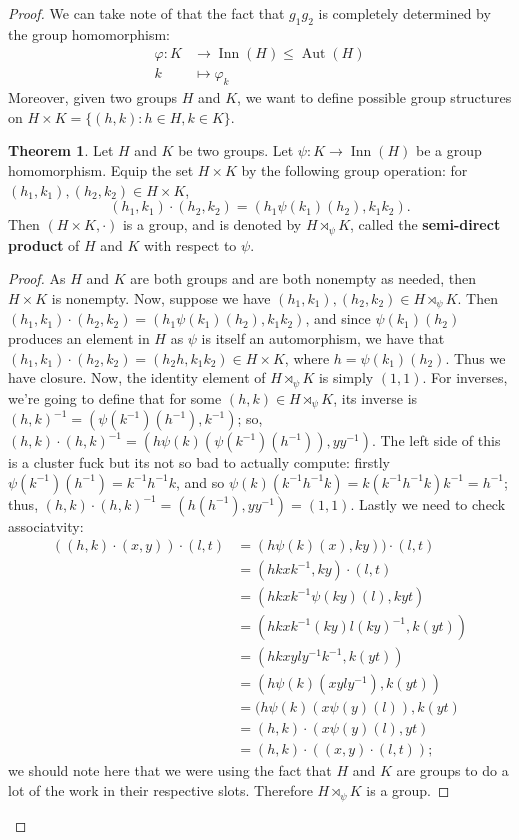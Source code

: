 \documentclass[9pt,reqno]{amsart}
\theoremstyle{definition}
\newtheorem{theorem}{Theorem}[section]
\DeclareMathOperator{\aut}{Aut}
\DeclareMathOperator{\inn}{Inn}
\newcommand{\lra}{\longrightarrow}
\newcommand{\lmt}{\longmapsto}
\begin{document}
\begin{proof}
We can take note of that the fact that $g_1 g_2$ is completely determined by the group homomorphism: 
\begin{align*} \varphi \colon K &\lra \inn (H) \leq \aut (H) \\  
k &\lmt \varphi_k 
\end{align*}
Moreover, given two groups $H$ and $K$, we want to define possible group structures on $H \times K = \{ (h, k) \colon h \in H, k \in K \}$. 
\begin{theorem} Let $H$ and $K$ be two groups. Let $\psi \colon K \lra \inn (H)$ be a group homomorphism. Equip the set $H \times K$ by the following group operation: for $(h_1, k_1), (h_2, k_2)  \in H \times K$, 
\[ (h_1, k_1) \cdot (h_2, k_2) = (h_1 \psi (k_1) (h_2), k_1 k_2 ) .\]
Then $(H \times K, \cdot)$ is a group, and is denoted by $H \rtimes_\psi K$, called the \textbf{semi-direct product} of $H$ and $K$ with respect to $\psi$. 
\begin{proof} As $H$ and $K$ are both groups and are both nonempty as needed, then $H \times K$ is nonempty. Now, suppose we have $(h_1, k_1), (h_2, k_2) \in H \rtimes_\psi K$. Then $(h_1, k_1) \cdot (h_2, k_2) = (h_1 \psi (k_1) (h_2), k_1 k_2 )$, and since $\psi (k_1) (h_2)$ produces an element in $H$ as $\psi$ is itself an automorphism, we have that $(h_1, k_1) \cdot (h_2, k_2) = (h_2 h, k_1 k_2 ) \in H \times K$, where $h = \psi (k_1) (h_2)$. Thus we have closure. Now, the identity element of $H \rtimes_\psi K$ is simply $(1, 1)$. For inverses, we're going to define that for some $(h, k) \in H \rtimes_\psi K$, its inverse is $(h, k)^{-1} = (\psi(k^{-1} )(h^{-1}) , k^{-1})$; so, $(h, k) \cdot (h, k)^{-1} = (h \psi (k)( \psi (k^{-1} ) (h^{-1} )) , yy^{-1} )$. The left side of this is a cluster fuck but its not so bad to actually compute: firstly $\psi (k^{-1} )(h^{-1}) = k^{-1} h^{-1} k$, and so $\psi (k) ( k^{-1} h^{-1} k) = k (k^{-1} h^{-1} k) k^{-1} =  h^{-1}$; thus, $(h, k) \cdot (h, k)^{-1} = (h(h^{-1}) , yy^{-1}) = (1, 1)$. Lastly we need to check associatvity:
\begin{align*}
 ( (h, k) \cdot (x, y) ) \cdot (l, t) &= (h \psi (k) (x), ky) ) \cdot (l, t)  \\
 &= (h kxk^{-1}, ky) \cdot (l, t) \\
 &= ( h kxk^{-1} \psi (ky) (l), kyt ) \\
 &= ( hkxk^{-1} (ky) l (ky)^{-1}, k(yt)) \\
 &= (hkx yly^{-1} k^{-1}, k(yt))  \\
 &= (h \psi(k) (xyly^{-1}) , k(yt)) \\
 &= (h \psi (k) (x\psi(y)(l)), k(yt) \\
  &= (h, k) \cdot (x \psi(y)(l), yt) \\ 
 &= (h, k) \cdot ( (x, y) \cdot (l, t)) ; 
\end{align*} 
we should note here that we were using the fact that $H$ and $K$ are groups to do a lot of the work in their respective slots. Therefore $H \rtimes_\psi K$ is a group. 
\end{proof}
\end{theorem}



\end{proof}
\end{document}
